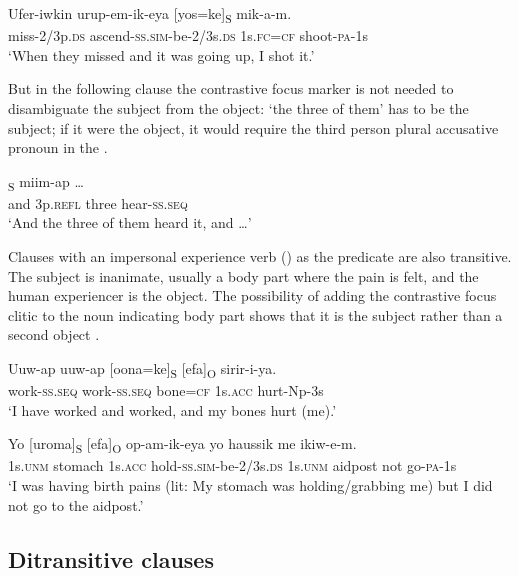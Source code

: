 \ea%
\label{ex:5:x938}
\gll Ufer-iwkin  urup-em-ik-eya  [yos=ke]\textsubscript{S}  mik-a-m. \\
     miss-2/3p.\textsc{ds}  ascend-\textsc{ss}.\textsc{sim}-be-2/3s.\textsc{ds}  1s.\textsc{fc}=\textsc{cf}  shoot-\textsc{pa}-1s \\
\glt `When they missed and it was going up, I shot it.'
\z

But in the following clause the contrastive focus marker is not needed to disambiguate the subject from the object:  `the three of them' has to be the subject; if it were the object, it would require the third person plural accusative pronoun  in the .

\ea%
\label{ex:5:x940}
\textsubscript{S}  miim-ap  {\dots} \\
     and  3p.\textsc{refl}  three  hear-\textsc{ss}.\textsc{seq} \\
\glt `And the three of them heard it, and {\dots}'
\z

Clauses with an impersonal experience verb () as the predicate are also transitive. The subject is inanimate, usually a body part where the pain is felt, and the human experiencer is the object. The possibility of adding the contrastive focus clitic to the noun indicating body part shows that it is the subject rather than a second object .

\ea%
\label{ex:5:x1012}
\gll Uuw-ap  uuw-ap  [oona=ke]\textsubscript{S}  [efa]\textsubscript{O}  sirir-i-ya. \\
     work-\textsc{ss}.\textsc{seq}  work-\textsc{ss}.\textsc{seq}  bone=\textsc{cf}  1s.\textsc{acc}  hurt-Np-3s \\
\glt `I have worked and worked, and my bones hurt (me).'
\z

\ea%
\label{ex:5:x1015}
\gll Yo  [uroma]\textsubscript{S}  [efa]\textsubscript{O}  op-am-ik-eya  yo  haussik me  ikiw-e-m. \\
     1s.\textsc{unm}  stomach  1s.\textsc{acc}  hold-\textsc{ss}.\textsc{sim}-be-2/3s.\textsc{ds}  1s.\textsc{unm}  aidpost not  go-\textsc{pa}-1s \\
\glt `I was having birth pains (lit: My stomach was holding/grabbing me) but I did not go to the aidpost.'
\z

\subsection{Ditransitive clauses} \label{sec:5.3.2}

